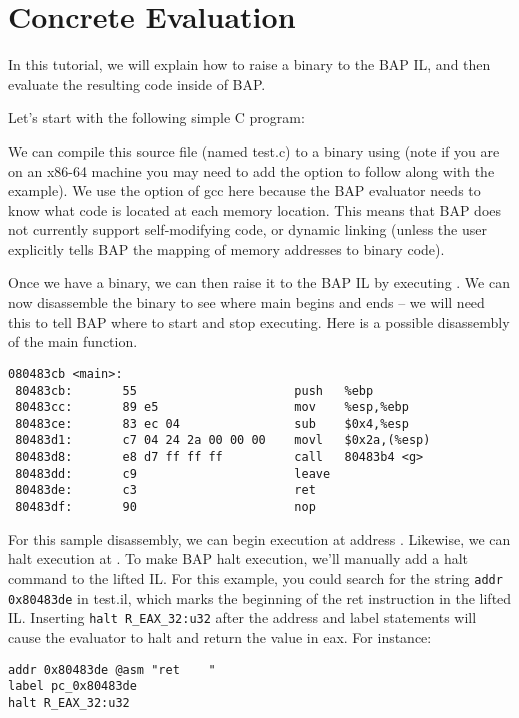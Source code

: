\section{Concrete Evaluation}

In this tutorial, we will explain how to raise a binary to the BAP IL,
and then evaluate the resulting code inside of BAP.

Let's start with the following simple C program:


We can compile this source file (named test.c) to a binary using
 (note if you are on an x86-64
machine you may need to add the  option to follow along
with the example).  We use the  option of gcc here
because the BAP evaluator needs to know what code is located at each
memory location. This means that BAP does not currently support
self-modifying code, or dynamic linking (unless the user explicitly
tells BAP the mapping of memory addresses to binary code).

Once we have a binary, we can then raise it to the BAP IL by executing
. We can now disassemble the binary
to see where main begins and ends -- we will need this to tell BAP
where to start and stop executing. Here is a possible disassembly of
the main function.

\begin{verbatim}
080483cb <main>:
 80483cb:       55                      push   %ebp
 80483cc:       89 e5                   mov    %esp,%ebp
 80483ce:       83 ec 04                sub    $0x4,%esp
 80483d1:       c7 04 24 2a 00 00 00    movl   $0x2a,(%esp)
 80483d8:       e8 d7 ff ff ff          call   80483b4 <g>
 80483dd:       c9                      leave  
 80483de:       c3                      ret    
 80483df:       90                      nop
\end{verbatim}

For this sample disassembly, we can begin execution at address
.  Likewise, we can halt execution at
.  To make BAP halt execution, we'll manually add a
halt command to the lifted IL.  For this example, you could search for
the string \verb!addr 0x80483de! in test.il, which marks the beginning
of the ret instruction in the lifted IL.  Inserting
\verb!halt R_EAX_32:u32!  after the address and label statements will
cause the evaluator to halt and return the value in eax.  For
instance:

\begin{verbatim}
addr 0x80483de @asm "ret    "
label pc_0x80483de
halt R_EAX_32:u32
\end{verbatim}

